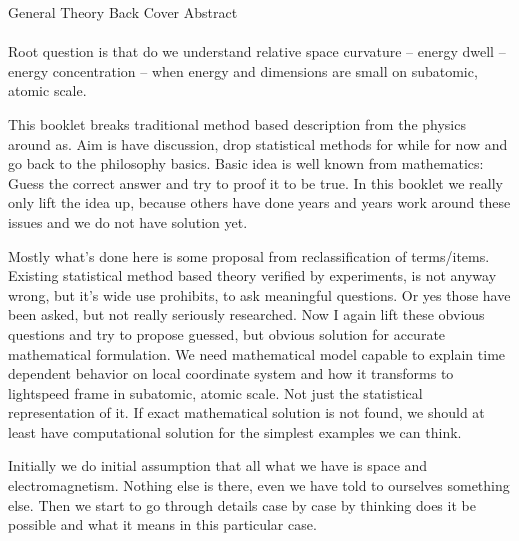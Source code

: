 %
%
%
\pagestyle{plain}
General Theory Back Cover Abstract
\label{abstract}\\\\
Root question is that do we understand relative space curvature -- energy
dwell -- energy concentration -- when energy and dimensions are small on
subatomic, atomic scale.

This booklet breaks traditional method based description from the physics
around as. Aim is have discussion, drop statistical methods for while for now
and go back to the philosophy basics. Basic idea is well known from
mathematics: Guess the correct answer and try to proof it to be true. In this
booklet we really only lift the idea up, because others have done years and
years work around these issues and we do not have solution yet.

Mostly what's done here is some proposal from reclassification of terms/items.
Existing statistical method based theory verified by experiments, is not
anyway wrong, but it's wide use prohibits, to ask meaningful questions. Or yes
those have been asked, but not really seriously researched. Now I again lift
these obvious questions and try to propose guessed, but obvious solution for
accurate mathematical formulation. We need mathematical model capable to
explain time dependent behavior on local coordinate system and how it
transforms to lightspeed frame in subatomic, atomic scale. Not just the
statistical representation of it. If exact mathematical solution is not found,
we should at least have computational solution for the simplest examples we
can think.
 
Initially we do initial assumption that all what we have is space and
electromagnetism. Nothing else is there, even we have told to ourselves
something else. Then we start to go through details case by case by thinking
does it be possible and what it means in this particular case.
